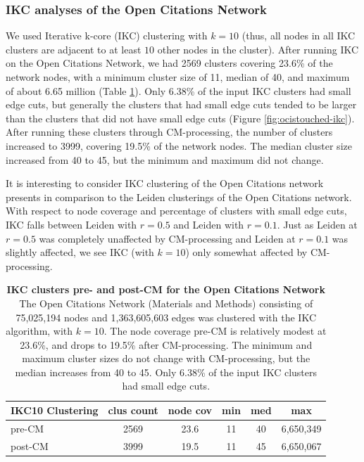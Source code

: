 \documentclass[11pt]{article}   	%
\begin{document}
\subsubsection{IKC analyses of the Open Citations Network}

We used Iterative k-core (IKC) clustering with $k=10$ (thus, all nodes in all  IKC clusters are adjacent to at least $10$ other nodes in the cluster). 
After running IKC on the Open Citations Network, we had 2569 clusters covering 23.6\% of the network nodes, with a minimum cluster size of 11, median of 40, and maximum of about 6.65 million (Table \ref{tab:IKC-11-OC-basicstats}). 
Only 6.38\% of the input IKC clusters had small edge cuts, but generally the clusters that had small edge cuts tended to be larger
than the clusters that did not have small edge cuts (Figure \ref{fig:ocistouched-ikc}).
After running these clusters through CM-processing, the number of clusters increased to 3999, covering 19.5\% of the network nodes. The  median cluster size increased from 40 to 45, but the minimum and maximum did not change.

It is interesting to consider IKC clustering of the Open Citations  network presents in comparison to the Leiden clusterings of the Open Citations network.
With respect to node coverage and percentage of clusters with small edge cuts, IKC falls between Leiden with $r=0.5$ and Leiden with $r=0.1$.  
Just as Leiden at $r=0.5$ was completely unaffected by CM-processing and Leiden at $r=0.1$ was slightly affected, 
we see IKC (with $k=10$) only somewhat affected by CM-processing. 




\begin{table}[ht]
\centering
\begin{tabular}{lccccc}
  \hline
  IKC10 Clustering & clus count & node cov & min & med & max       \\ \hline
  pre-CM     & 2569       & 23.6     & 11  & 40  & 6,650,349 \\
  post-CM & 3999 & 19.5 & 11 & 45 & 6,650,067\\
  \hline
\end{tabular}
\caption[IKC clusters pre- and post-CM for the Open Citations Network]{\textbf{IKC clusters pre- and post-CM for the Open Citations Network} The Open Citations Network (Materials and Methods) consisting of 75,025,194 nodes and 1,363,605,603 edges was clustered with the IKC algorithm, with $k=10$. The node coverage pre-CM  is relatively modest at 23.6\%, and drops to 19.5\% after CM-processing.  The minimum and maximum cluster sizes do not change with CM-processing, but the median increases from 40 to 45.   Only 6.38\% of the input IKC clusters had small edge cuts.}
\label{tab:IKC-11-OC-basicstats}
\end{table}
\end{document}
